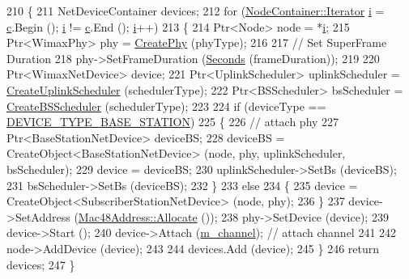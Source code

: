 \begin{DoxyCode}
210 \{
211   NetDeviceContainer devices;
212   \textcolor{keywordflow}{for} (\hyperlink{classns3_1_1NodeContainer_aa1a9f2d2b09bfef7d066d3974bca2cc4}{NodeContainer::Iterator} \hyperlink{bernuolliDistribution_8m_a6f6ccfcf58b31cb6412107d9d5281426}{i} = \hyperlink{lte_2model_2fading-traces_2fading__trace__generator_8m_ae0323a9039add2978bf5b49550572c7c}{c}.Begin (); \hyperlink{bernuolliDistribution_8m_a6f6ccfcf58b31cb6412107d9d5281426}{i} != \hyperlink{lte_2model_2fading-traces_2fading__trace__generator_8m_ae0323a9039add2978bf5b49550572c7c}{c}.End (); 
      \hyperlink{bernuolliDistribution_8m_a6f6ccfcf58b31cb6412107d9d5281426}{i}++)
213     \{
214       Ptr<Node> node = *\hyperlink{bernuolliDistribution_8m_a6f6ccfcf58b31cb6412107d9d5281426}{i};
215       Ptr<WimaxPhy> phy = \hyperlink{classns3_1_1WimaxHelper_a5b287ad1386475dde1e946910a203899}{CreatePhy} (phyType);
216 
217       \textcolor{comment}{// Set SuperFrame Duration}
218       phy->SetFrameDuration (\hyperlink{group__timecivil_ga33c34b816f8ff6628e33d5c8e9713b9e}{Seconds} (frameDuration));
219 
220       Ptr<WimaxNetDevice> device;
221       Ptr<UplinkScheduler> uplinkScheduler = \hyperlink{classns3_1_1WimaxHelper_a3b237b459ffd98a13d71612d985f9e90}{CreateUplinkScheduler} (schedulerType);
222       Ptr<BSScheduler> bsScheduler = \hyperlink{classns3_1_1WimaxHelper_a583fc7ce6463c687092e9ef8d03413af}{CreateBSScheduler} (schedulerType);
223 
224       \textcolor{keywordflow}{if} (deviceType == \hyperlink{classns3_1_1WimaxHelper_a2c8fd9211cf4d7605e506b7c983d78fca96e5d9ff34a8a0da1262f37e83abc43b}{DEVICE\_TYPE\_BASE\_STATION})
225         \{
226           \textcolor{comment}{// attach phy}
227           Ptr<BaseStationNetDevice> deviceBS;
228           deviceBS = CreateObject<BaseStationNetDevice> (node, phy, uplinkScheduler, bsScheduler);
229           device = deviceBS;
230           uplinkScheduler->SetBs (deviceBS);
231           bsScheduler->SetBs (deviceBS);
232         \}
233       \textcolor{keywordflow}{else}
234         \{
235           device = CreateObject<SubscriberStationNetDevice> (node, phy);
236         \}
237       device->SetAddress (\hyperlink{classns3_1_1Mac48Address_a203b53c035649c0d4881fa1115aa2cdb}{Mac48Address::Allocate} ());
238       phy->SetDevice (device);
239       device->Start ();
240       device->Attach (\hyperlink{classns3_1_1WimaxHelper_a2d6f863b9fa5d811edd856802ecb0bc3}{m\_channel}); \textcolor{comment}{// attach channel}
241 
242       node->AddDevice (device);
243 
244       devices.Add (device);
245     \}
246   \textcolor{keywordflow}{return} devices;
247 \}
\end{DoxyCode}



